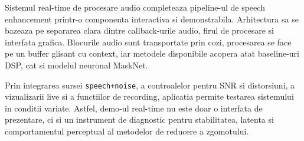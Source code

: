 Sistemul real-time de procesare audio completeaza pipeline-ul de speech
enhancement printr-o componenta interactiva si demonstrabila. Arhitectura sa
se bazeaza pe separarea clara dintre callback-urile audio, firul de procesare
si interfata grafica. Blocurile audio sunt transportate prin cozi, procesarea
se face pe un buffer glisant cu context, iar metodele disponibile acopera atat
baseline-uri DSP, cat si modelul neuronal MaskNet.

Prin integrarea sursei \texttt{speech+noise}, a controalelor pentru SNR si
distorsiuni, a vizualizarii live si a functiilor de recording, aplicatia permite
testarea sistemului in conditii variate. Astfel, demo-ul real-time nu este doar
o interfata de prezentare, ci si un instrument de diagnostic pentru stabilitatea,
latenta si comportamentul perceptual al metodelor de reducere a zgomotului.
